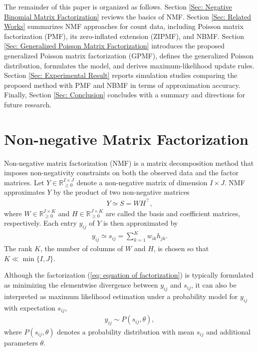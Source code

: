 \documentclass[pdflatex,sn-basic]{sn-jnl}%
\theoremstyle{thmstyleone}%
\theoremstyle{thmstyletwo}%
\theoremstyle{thmstylethree}%
\begin{document}
The remainder of this paper is organized as follows.
Section \ref{Sec: Negative Binomial Matrix Factorization} reviews the basics of NMF.
Section \ref{Sec: Related Works} summarizes NMF approaches for count data, including Poisson matrix factorization (PMF), its zero-inflated extension (ZIPMF), and NBMF.
Section \ref{Sec: Generalized Poisson Matrix Factorization} introduces the proposed generalized Poisson matrix factorization (GPMF), defines the generalized Poisson distribution, formulates the model, and derives maximum-likelihood update rules.
Section \ref{Sec: Experimental Result} reports simulation studies comparing the proposed method with PMF and NBMF in terms of approximation accuracy.
Finally, Section \ref{Sec: Conclusion} concludes with a summary and directions for future research.





\section{Non-negative Matrix Factorization}\label{Sec: Non-negative Matrix Factorization}
Non-negative matrix factorization (NMF) is a matrix decomposition method that imposes non-negativity constraints on both the observed data and the factor matrices.  
Let $Y \in \mathbb{R}_{\geq 0}^{I \times J}$ denote a non-negative matrix of dimension $I \times J$.  
NMF approximates $Y$ by the product of two non-negative matrices
\begin{align}
	Y \simeq S = WH^{\top},
\end{align}
where $W \in \mathbb{R}_{\ge 0}^{I \times K}$ and $H \in \mathbb{R}_{\ge 0}^{J \times K}$ are called the basis and coefficient matrices, respectively.  
Each entry $y_{ij}$ of $Y$ is then approximated by
\begin{align}
	y_{ij} \simeq s_{ij} = \sum_{k=1}^{K} w_{ik} h_{jk}. \label{eq: equation of factorization}
\end{align}
The rank $K$, the number of columns of $W$ and $H$, is chosen so that $K \ll \min\{I,J\}$.

Although the factorization (\ref{eq: equation of factorization}) is typically formulated as minimizing the elementwise divergence between $y_{ij}$ and $s_{ij}$, it can also be interpreted as maximum likelihood estimation under a probability model for $y_{ij}$ with expectation $s_{ij}$,
\begin{align}
	y_{ij} \sim P(s_{ij},\theta), \label{eq: statistical model representation of NMF}
\end{align}
where $P(s_{ij},\theta)$ denotes a probability distribution with mean $s_{ij}$ and additional parameters $\theta$.
\end{document}
